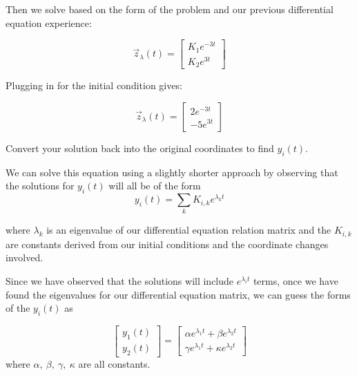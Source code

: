 \begin{enumerate}
{Then we solve based on the form of the problem and our previous differential equation experience:

\[\vec z_{\lambda}(t) = \begin{bmatrix} K_1 e^{-3t} \\ K_2 e^{3t} \end{bmatrix} \]

Plugging in for the initial condition gives:

\[\vec z_{\lambda}(t) = \begin{bmatrix} 2 e^{-3t} \\ -5 e^{3t} \end{bmatrix} \]

}







\qitem Convert your solution back into the original coordinates to find $y_i(t)$.

\sol{
\[ \vec y(t) = V \vec z_{\lambda}(t) =  \begin{bmatrix} -1 & -1 \\ 4 & 1\end{bmatrix}\begin{bmatrix} 2 e^{-3t} \\ -5 e^{3t}  \end{bmatrix} = \begin{bmatrix} -2e^{-3t} + 5 e^{3t}\\ 8e^{-3t}-5e^{3t} \end{bmatrix}\]
}








\qitem We can solve this equation using a slightly shorter approach by observing that the solutions for $y_i(t)$ will all be of the form
\[y_i(t) = \sum_k K_{i,k} e^{\lambda_k t}\]

where $\lambda_k$ is an eigenvalue of our differential equation
relation matrix and the $K_{i,k}$ are constants derived from our
initial conditions and the coordinate changes involved. 

Since we have observed that the solutions will include
$e^{\lambda_i t}$ terms, once we have found the eigenvalues for our
differential equation matrix, we can guess the forms of the $y_i(t)$ as

 	\[\begin{bmatrix}y_1(t) \\ y_2(t)\end{bmatrix}
        = \begin{bmatrix}\alpha e^{\lambda_1t} + \beta e^{\lambda_2t}
          \\ \gamma e^{\lambda_1 t}  + \kappa e^{\lambda_2 t} \end{bmatrix}\]
where $\alpha, ~\beta, ~\gamma, ~\kappa$ are all constants.


\end{enumerate}
